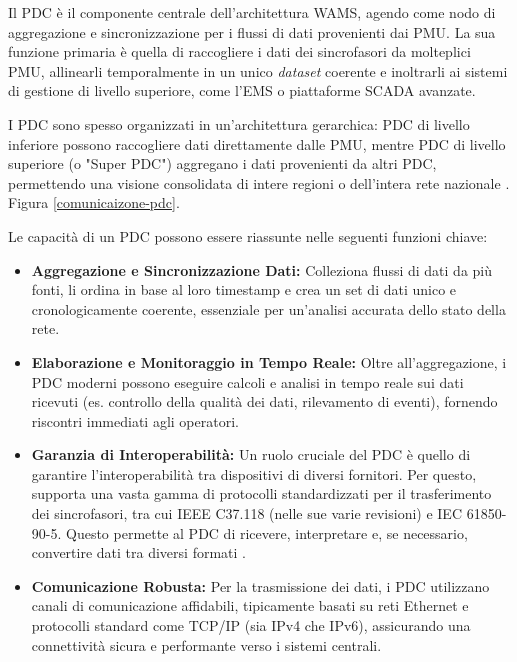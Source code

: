 

Il PDC è il componente centrale dell'architettura WAMS, agendo come nodo di aggregazione e sincronizzazione per i flussi di dati provenienti dai PMU. La sua funzione primaria è quella di raccogliere i dati dei sincrofasori da molteplici PMU, allinearli temporalmente in un unico \textit{dataset} coerente e inoltrarli ai sistemi di gestione di livello superiore, come l'EMS o piattaforme SCADA avanzate.


I PDC sono spesso organizzati in un'architettura gerarchica: PDC di livello inferiore possono raccogliere dati direttamente dalle PMU, mentre PDC di livello superiore (o "Super PDC") aggregano i dati provenienti da altri PDC, permettendo una visione consolidata di intere regioni o dell'intera rete nazionale \cite{PDC}. Figura \ref{comunicaizone-pdc}.


Le capacità di un PDC possono essere riassunte nelle seguenti funzioni chiave:

\begin{itemize}
    \item \textbf{Aggregazione e Sincronizzazione Dati:} Colleziona flussi di dati da più fonti, li ordina in base al loro timestamp e crea un set di dati unico e cronologicamente coerente, essenziale per un'analisi accurata dello stato della rete.
    \item \textbf{Elaborazione e Monitoraggio in Tempo Reale:} Oltre all'aggregazione, i PDC moderni possono eseguire calcoli e analisi in tempo reale sui dati ricevuti (es. controllo della qualità dei dati, rilevamento di eventi), fornendo riscontri immediati agli operatori.
    \item \textbf{Garanzia di Interoperabilità:} Un ruolo cruciale del PDC è quello di garantire l'interoperabilità tra dispositivi di diversi fornitori. Per questo, supporta una vasta gamma di protocolli standardizzati per il trasferimento dei sincrofasori, tra cui IEEE C37.118 (nelle sue varie revisioni) e IEC 61850-90-5. Questo permette al PDC di ricevere, interpretare e, se necessario, convertire dati tra diversi formati \cite{IEEE-article-PDC}.
    \item \textbf{Comunicazione Robusta:} Per la trasmissione dei dati, i PDC utilizzano canali di comunicazione affidabili, tipicamente basati su reti Ethernet e protocolli standard come TCP/IP (sia IPv4 che IPv6), assicurando una connettività sicura e performante verso i sistemi centrali.
\end{itemize}


